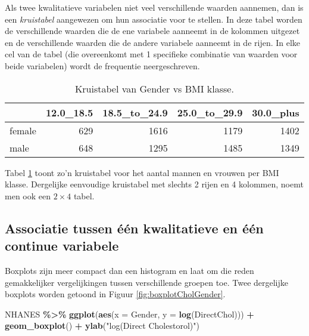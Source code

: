 \documentclass[
  12pt,dutch,coursenotes]{book}
\newenvironment{Shaded}{\begin{snugshade}}{\end{snugshade}}
\newcommand{\DataTypeTok}[1]{\textcolor[rgb]{0.13,0.29,0.53}{#1}}
\newcommand{\KeywordTok}[1]{\textcolor[rgb]{0.13,0.29,0.53}{\textbf{#1}}}
\newcommand{\NormalTok}[1]{#1}
\newcommand{\OperatorTok}[1]{\textcolor[rgb]{0.81,0.36,0.00}{\textbf{#1}}}
\newcommand{\StringTok}[1]{\textcolor[rgb]{0.31,0.60,0.02}{#1}}
\theoremstyle{definition}
\theoremstyle{definition}
\theoremstyle{definition}
\theoremstyle{remark}
\begin{document}
Als twee kwalitatieve variabelen niet veel verschillende waarden aannemen,
dan is een \emph{kruistabel} aangewezen om hun associatie voor te stellen.
In deze tabel worden de verschillende waarden die de ene variabele aanneemt
in de kolommen uitgezet en de verschillende waarden die de andere variabele
aanneemt in de rijen. In elke cel van de tabel (die overeenkomt met 1
specifieke combinatie van waarden voor beide variabelen) wordt de frequentie
neergeschreven.

\begin{table}[t]

\caption{\label{tab:genderBMI}Kruistabel van Gender vs BMI klasse.}
\centering
\begin{tabular}{lrrrr}
\toprule
  & 12.0\_18.5 & 18.5\_to\_24.9 & 25.0\_to\_29.9 & 30.0\_plus\\
\midrule
female & 629 & 1616 & 1179 & 1402\\
male & 648 & 1295 & 1485 & 1349\\
\bottomrule
\end{tabular}
\end{table}

Tabel \ref{tab:genderBMI} toont zo'n kruistabel voor het aantal mannen en vrouwen per BMI klasse. Dergelijke eenvoudige kruistabel met slechts 2 rijen en 4 kolommen, noemt men ook een \(2\times 4\) tabel.

\hypertarget{subsec:asskwalcont}{%
\subsection{Associatie tussen één kwalitatieve en één continue variabele}\label{subsec:asskwalcont}}

Boxplots zijn meer compact dan een histogram en laat om die reden gemakkelijker vergelijkingen tussen verschillende groepen toe. Twee dergelijke boxplots
worden getoond in Figuur \ref{fig:boxplotCholGender}.

\begin{Shaded}
\begin{Highlighting}[]
\NormalTok{NHANES }\OperatorTok{\%\textgreater{}\%}\StringTok{ }\KeywordTok{ggplot}\NormalTok{(}\KeywordTok{aes}\NormalTok{(}\DataTypeTok{x =}\NormalTok{ Gender, }\DataTypeTok{y =} \KeywordTok{log}\NormalTok{(DirectChol))) }\OperatorTok{+}\StringTok{ }
\StringTok{    }\KeywordTok{geom\_boxplot}\NormalTok{() }\OperatorTok{+}\StringTok{ }\KeywordTok{ylab}\NormalTok{(}\StringTok{"log(Direct Cholestorol)"}\NormalTok{)}
\end{Highlighting}
\end{Shaded}
\end{document}
